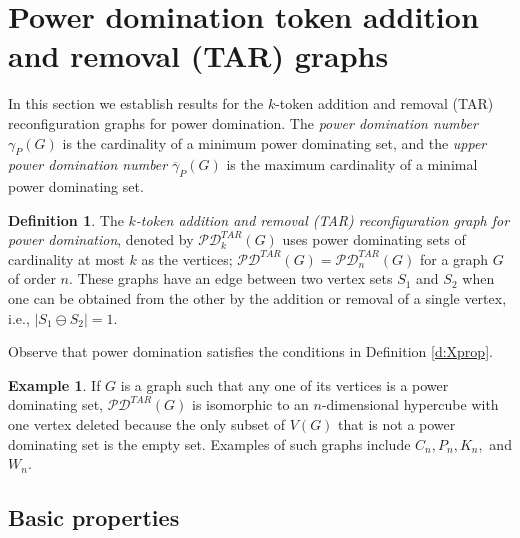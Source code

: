 \documentclass{article}
\numberwithin{figure}{section}   %
\theoremstyle{definition}
\theoremstyle{definition}
\newtheorem{defn}[thm]{Definition}
\theoremstyle{definition}
\newtheorem{ex}[thm]{Example}
\newcommand{\ol}{\overline}
\newcommand{\pd}{\gamma_P}
\newcommand{\pdbar}{\ol\pd}
\newcommand{\tar}{\mathscr{PD}^{TAR}}
\newcommand{\df}[1]{{\textcolor{red}{[}\textcolor{red}{{DF: \em #1}]}}}
\begin{document}
\section{Power domination token addition and removal (TAR) graphs}\label{s:TAR}

 In this section we establish results for the $k$-token addition and removal (TAR) reconfiguration graphs for power domination.  The {\em power domination number}  $\pd(G)$ is the cardinality of a {minimum} power dominating set, and the {\em upper power domination number}  $\pdbar(G)$ is the maximum cardinality of a {minimal} power dominating set.  

\begin{defn} The {\em $k$-token addition and removal (TAR) reconfiguration graph for power domination}, denoted by $\tar_k(G)$ uses   power dominating sets of cardinality at most $k$ as the vertices; $\tar (G)=\tar_n(G)$ for a graph $G$ of order $n$.  These graphs have an edge between two vertex sets $S_1$ and $S_2$ when one can be obtained from the other by the addition or removal of a single vertex, i.e., $|S_1 \ominus S_2|=1$.  
\end{defn}


Observe that power domination satisfies the conditions in Definition \ref{d:Xprop}.

\begin{ex} If $G$ is a graph such that any one of its vertices is a power dominating set, $\tar(G)$ is isomorphic to an $n$-dimensional hypercube with one vertex deleted  because the only subset of $V(G)$ that is not a power dominating set is the empty set.  Examples of such graphs include $C_n, P_n, K_n,$ and $W_n$.
\end{ex}

\subsection{Basic properties}\label{ss:basic}

\end{document}
